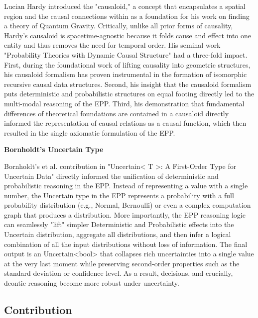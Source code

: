 Lucian Hardy introduced the "causaloid,"\cite{HardyDynamicCausalStructure} a concept that encapsulates a spatial region and the causal connections within 
as a foundation for his work on finding a theory of Quantum Gravity. Critically, unlike all prior forms of causality, 
Hardy's causaloid is spacetime-agnostic because it folds cause and effect into one entity and thus removes the need for temporal order. His seminal work "Probability Theories with Dynamic Causal Structure" \cite{hardy2005probability} had a three-fold impact.
First, during the foundational work of lifting causality into geometric structures, his causaloid formalism has
proven instrumental in the formation of isomorphic recursive causal data structures. 
Second, his insight that the causaloid formalism puts deterministic and probabilistic structures on equal footing directly led to the multi-modal reasoning of the EPP. 
Third, his demonstration that fundamental differences of theoretical foundations are contained in a causaloid directly informed the representation of causal relations 
as a causal function, which then resulted in the single axiomatic formulation of the EPP.

\newpage

\textbf{Bornholdt's Uncertain Type}

Bornholdt's et al. contribution in "Uncertain< T >: A First-Order Type for Uncertain Data" \cite{bornholt2014uncertain} directly informed the unification of deterministic and probabilistic reasoning in the EPP. Instead of representing a value with a single number, the Uncertain type in the EPP represents a probability with a full probability distribution (e.g., Normal, Bernoulli) or even a complex computation graph that produces a distribution. More importantly, the EPP reasoning logic can seamlessly "lift" simpler Deterministic and Probabilistic effects into the Uncertain distribution, aggregate all distributions, and then infer a logical combination of all the input distributions without loss of information. The final output is an Uncertain<bool> that collapses rich uncertainties into a single value at the very last moment while preserving second-order properties such as the standard deviation or confidence level. As a result, decisions, and crucially, deontic reasoning become more robust under uncertainty.


\subsection{Contribution}

